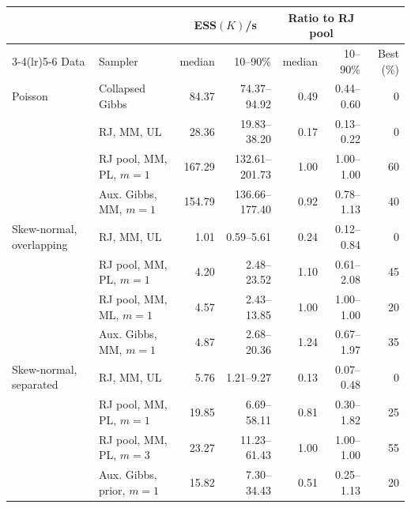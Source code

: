 \begin{tabular}{l l rr rr r}
\toprule
 & & \multicolumn{2}{c}{ESS$(K)$/s} & \multicolumn{2}{c}{Ratio to RJ pool} & \\
\cmidrule(lr){3-4}\cmidrule(lr){5-6}
Data & Sampler & median & 10--90\% & median & 10--90\% & Best (\%) \\
\midrule
Poisson & Collapsed Gibbs & 84.37 & 74.37--94.92 & 0.49 & 0.44--0.60 & 0 \\
 & RJ, MM, UL & 28.36 & 19.83--38.20 & 0.17 & 0.13--0.22 & 0 \\
 & RJ pool, MM, PL, $m{=}1$ & 167.29 & 132.61--201.73 & 1.00 & 1.00--1.00 & 60 \\
 & Aux. Gibbs, MM, $m{=}1$ & 154.79 & 136.66--177.40 & 0.92 & 0.78--1.13 & 40 \\
\addlinespace
Skew-normal, overlapping & RJ, MM, UL & 1.01 & 0.59--5.61 & 0.24 & 0.12--0.84 & 0 \\
 & RJ pool, MM, PL, $m{=}1$ & 4.20 & 2.48--23.52 & 1.10 & 0.61--2.08 & 45 \\
 & RJ pool, MM, ML, $m{=}1$ & 4.57 & 2.43--13.85 & 1.00 & 1.00--1.00 & 20 \\
 & Aux. Gibbs, MM, $m{=}1$ & 4.87 & 2.68--20.36 & 1.24 & 0.67--1.97 & 35 \\
\addlinespace
Skew-normal, separated & RJ, MM, UL & 5.76 & 1.21--9.27 & 0.13 & 0.07--0.48 & 0 \\
 & RJ pool, MM, PL, $m{=}1$ & 19.85 & 6.69--58.11 & 0.81 & 0.30--1.82 & 25 \\
 & RJ pool, MM, PL, $m{=}3$ & 23.27 & 11.23--61.43 & 1.00 & 1.00--1.00 & 55 \\
 & Aux. Gibbs, prior, $m{=}1$ & 15.82 & 7.30--34.43 & 0.51 & 0.25--1.13 & 20 \\
\bottomrule
\end{tabular}
